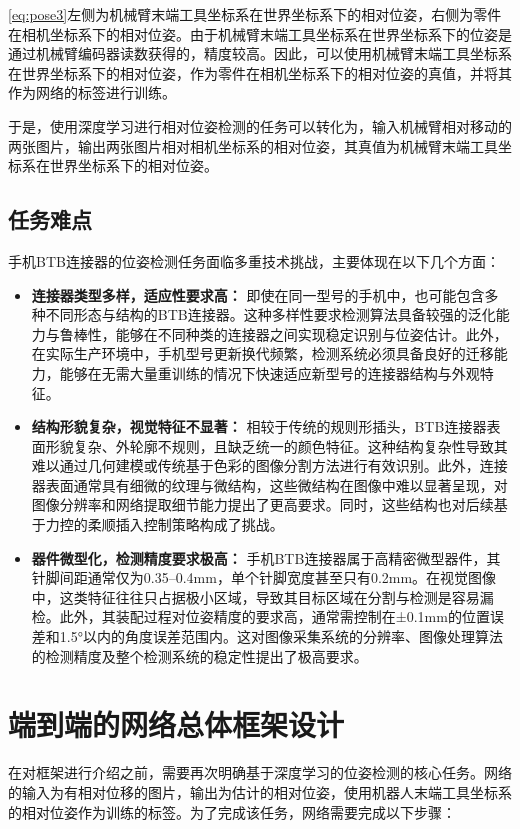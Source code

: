 \documentclass{Diploma}
\begin{document}
\eqref{eq:pose3}左侧为机械臂末端工具坐标系在世界坐标系下的相对位姿，右侧为零件在相机坐标系下的相对位姿。由于机械臂末端工具坐标系在世界坐标系下的位姿是通过机械臂编码器读数获得的，精度较高。因此，可以使用机械臂末端工具坐标系在世界坐标系下的相对位姿，作为零件在相机坐标系下的相对位姿的真值，并将其作为网络的标签进行训练。

于是，使用深度学习进行相对位姿检测的任务可以转化为，输入机械臂相对移动的两张图片，输出两张图片相对相机坐标系的相对位姿，其真值为机械臂末端工具坐标系在世界坐标系下的相对位姿。
\subsection{任务难点}
手机BTB连接器的位姿检测任务面临多重技术挑战，主要体现在以下几个方面：

\begin{itemize}
\item \textbf{连接器类型多样，适应性要求高：} 即使在同一型号的手机中，也可能包含多种不同形态与结构的BTB连接器。这种多样性要求检测算法具备较强的泛化能力与鲁棒性，能够在不同种类的连接器之间实现稳定识别与位姿估计。此外，在实际生产环境中，手机型号更新换代频繁，检测系统必须具备良好的迁移能力，能够在无需大量重训练的情况下快速适应新型号的连接器结构与外观特征。
\item \textbf{结构形貌复杂，视觉特征不显著：} 相较于传统的规则形插头，BTB连接器表面形貌复杂、外轮廓不规则，且缺乏统一的颜色特征。这种结构复杂性导致其难以通过几何建模或传统基于色彩的图像分割方法进行有效识别。此外，连接器表面通常具有细微的纹理与微结构，这些微结构在图像中难以显著呈现，对图像分辨率和网络提取细节能力提出了更高要求。同时，这些结构也对后续基于力控的柔顺插入控制策略构成了挑战。
\item \textbf{器件微型化，检测精度要求极高：} 手机BTB连接器属于高精密微型器件，其针脚间距通常仅为0.35--0.4mm，单个针脚宽度甚至只有0.2mm。在视觉图像中，这类特征往往只占据极小区域，导致其目标区域在分割与检测是容易漏检。此外，其装配过程对位姿精度的要求高，通常需控制在±0.1mm的位置误差和1.5°以内的角度误差范围内。这对图像采集系统的分辨率、图像处理算法的检测精度及整个检测系统的稳定性提出了极高要求。
\end{itemize}
\section{端到端的网络总体框架设计}
在对框架进行介绍之前，需要再次明确基于深度学习的位姿检测的核心任务。网络的输入为有相对位移的图片，输出为估计的相对位姿，使用机器人末端工具坐标系的相对位姿作为训练的标签。为了完成该任务，网络需要完成以下步骤：
\end{document}
